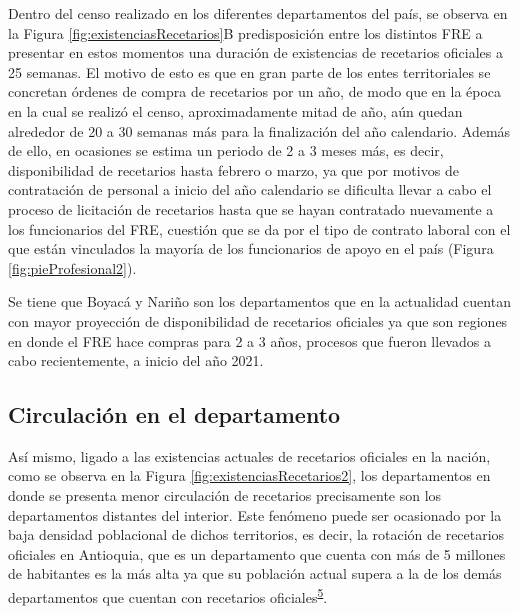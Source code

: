 \documentclass[
]{book}
\begin{document}
Dentro del censo realizado en los diferentes departamentos del país, se observa en la Figura \ref{fig:existenciasRecetarios}B predisposición entre los distintos FRE a presentar en estos momentos una duración de existencias de recetarios oficiales a 25 semanas. El motivo de esto es que en gran parte de los entes territoriales se concretan órdenes de compra de recetarios por un año, de modo que en la época en la cual se realizó el censo, aproximadamente mitad de año, aún quedan alrededor de 20 a 30 semanas más para la finalización del año calendario. Además de ello, en ocasiones se estima un periodo de 2 a 3 meses más, es decir, disponibilidad de recetarios hasta febrero o marzo, ya que por motivos de contratación de personal a inicio del año calendario se dificulta llevar a cabo el proceso de licitación de recetarios hasta que se hayan contratado nuevamente a los funcionarios del FRE, cuestión que se da por el tipo de contrato laboral con el que están vinculados la mayoría de los funcionarios de apoyo en el país (Figura \ref{fig:pieProfesional2}).

Se tiene que Boyacá y Nariño son los departamentos que en la actualidad cuentan con mayor proyección de disponibilidad de recetarios oficiales ya que son regiones en donde el FRE hace compras para 2 a 3 años, procesos que fueron llevados a cabo recientemente, a inicio del año 2021.

\hypertarget{circulaciuxf3n-en-el-departamento}{%
\subsection{Circulación en el departamento}\label{circulaciuxf3n-en-el-departamento}}

Así mismo, ligado a las existencias actuales de recetarios oficiales en la nación, como se observa en la Figura \ref{fig:existenciasRecetarios2}, los departamentos en donde se presenta menor circulación de recetarios precisamente son los departamentos distantes del interior. Este fenómeno puede ser ocasionado por la baja densidad poblacional de dichos territorios, es decir, la rotación de recetarios oficiales en Antioquia, que es un departamento que cuenta con más de 5 millones de habitantes es la más alta ya que su población actual supera a la de los demás departamentos que cuentan con recetarios oficiales\textsuperscript{\protect\hyperlink{ref-DANE2021}{5}}.
\end{document}
